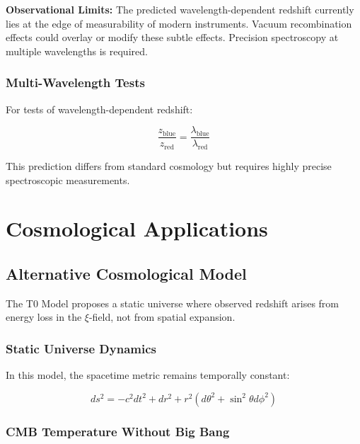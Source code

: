 \documentclass[12pt,a4paper]{report}
\begin{document}
	\begin{caution}
		\textbf{Observational Limits:} The predicted wavelength-dependent redshift currently lies at the edge of measurability of modern instruments. Vacuum recombination effects could overlay or modify these subtle effects. Precision spectroscopy at multiple wavelengths is required.
	\end{caution}
	
	\subsection{Multi-Wavelength Tests}
	
	For tests of wavelength-dependent redshift:
	
	\begin{equation}
		\frac{z_{\text{blue}}}{z_{\text{red}}} = \frac{\lambda_{\text{blue}}}{\lambda_{\text{red}}}
	\end{equation}
	
	This prediction differs from standard cosmology but requires highly precise spectroscopic measurements.
	
	\chapter{Cosmological Applications}
	
	\section{Alternative Cosmological Model}
	
	\begin{revolutionary}
		The T0 Model proposes a static universe where observed redshift arises from energy loss in the $\xi$-field, not from spatial expansion.
	\end{revolutionary}
	
	\subsection{Static Universe Dynamics}
	
	In this model, the spacetime metric remains temporally constant:
	
	\begin{equation}
		ds^2 = -c^2 dt^2 + dr^2 + r^2(d\theta^2 + \sin^2\theta d\phi^2)
	\end{equation}
	
	\subsection{CMB Temperature Without Big Bang}
	
\end{document}
